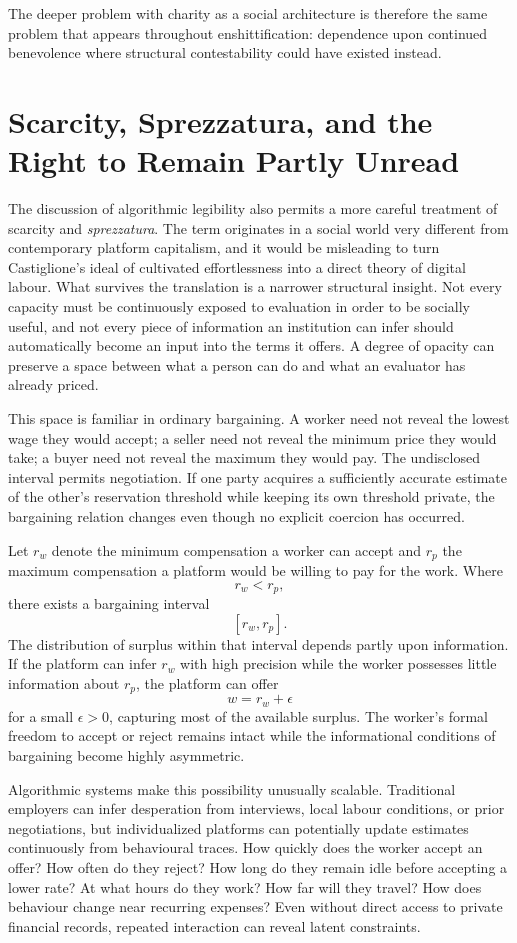 \documentclass[11pt]{article}
\begin{document}
The deeper problem with charity as a social architecture is therefore the same problem that appears throughout enshittification: dependence upon continued benevolence where structural contestability could have existed instead.

\section{Scarcity, Sprezzatura, and the Right to Remain Partly Unread}

The discussion of algorithmic legibility also permits a more careful treatment of scarcity and \emph{sprezzatura}. The term originates in a social world very different from contemporary platform capitalism, and it would be misleading to turn Castiglione's ideal of cultivated effortlessness into a direct theory of digital labour. What survives the translation is a narrower structural insight. Not every capacity must be continuously exposed to evaluation in order to be socially useful, and not every piece of information an institution can infer should automatically become an input into the terms it offers. A degree of opacity can preserve a space between what a person can do and what an evaluator has already priced.

This space is familiar in ordinary bargaining. A worker need not reveal the lowest wage they would accept; a seller need not reveal the minimum price they would take; a buyer need not reveal the maximum they would pay. The undisclosed interval permits negotiation. If one party acquires a sufficiently accurate estimate of the other's reservation threshold while keeping its own threshold private, the bargaining relation changes even though no explicit coercion has occurred.

Let \(r_w\) denote the minimum compensation a worker can accept and \(r_p\) the maximum compensation a platform would be willing to pay for the work. Where
\[
r_w < r_p,
\]
there exists a bargaining interval
\[
[r_w,r_p].
\]
The distribution of surplus within that interval depends partly upon information. If the platform can infer \(r_w\) with high precision while the worker possesses little information about \(r_p\), the platform can offer
\[
w = r_w+\epsilon
\]
for a small \(\epsilon>0\), capturing most of the available surplus. The worker's formal freedom to accept or reject remains intact while the informational conditions of bargaining become highly asymmetric.

Algorithmic systems make this possibility unusually scalable. Traditional employers can infer desperation from interviews, local labour conditions, or prior negotiations, but individualized platforms can potentially update estimates continuously from behavioural traces. How quickly does the worker accept an offer? How often do they reject? How long do they remain idle before accepting a lower rate? At what hours do they work? How far will they travel? How does behaviour change near recurring expenses? Even without direct access to private financial records, repeated interaction can reveal latent constraints.
\end{document}
